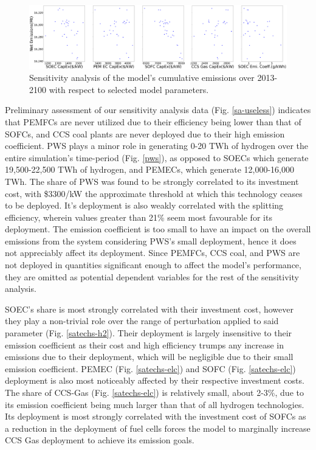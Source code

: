 \begin{figure}[H] 
\centering
\includegraphics[scale=0.15]{figures/co2emi}
\caption{Sensitivity analysis of the model's cumulative emissions over 2013-2100 with respect to selected model parameters.}
\label{co2emi}
\end{figure}

Preliminary assessment of our sensitivity analysis data (Fig. \ref{sa-useless}) indicates that \gls{PEMFC}s are never utilized due to their efficiency being lower than that of \gls{SOFC}s, and \gls{CCS} coal plants are never deployed due to their high emission coefficient. \gls{PWS} plays a minor role in generating 0-20 TWh of hydrogen over the entire simulation's time-period (Fig. \ref{pws}), as opposed to \gls{SOEC}s which generate 19,500-22,500 TWh of hydrogen, and \gls{PEMEC}s, which generate 12,000-16,000 TWh. The share of \gls{PWS} was found to be strongly correlated to its investment cost, with \$3300/kW the approximate threshold at which this technology ceases to be deployed. It's deployment is also weakly correlated with the splitting efficiency, wherein values greater than 21\% seem most favourable for its deployment. The emission coefficient is too small to have an impact on the overall emissions from the system considering \gls{PWS}'s small deployment, hence it does not appreciably affect its deployment. Since \gls{PEMFC}s, \gls{CCS} coal, and \gls{PWS} are not deployed in quantities significant enough to affect the model's performance, they are omitted as potential dependent variables for the rest of the sensitivity analysis.

\gls{SOEC}'s share is most strongly correlated with their investment cost, however they play a non-trivial role over the range of perturbation applied to said parameter (Fig. \ref{satechs-h2}). Their deployment is largely insensitive to their emission coefficient as their cost and high efficiency trumps any increase in emissions due to their deployment, which will be negligible due to their small emission coefficient. \gls{PEMEC} (Fig. \ref{satechs-elc}) and \gls{SOFC} (Fig. \ref{satechs-elc}) deployment is also most noticeably affected by their respective investment costs. The share of \gls{CCS}-Gas (Fig. \ref{satechs-elc}) is relatively small, about 2-3\%, due to its emission coefficient being much larger than that of all hydrogen technologies. Its deployment is most strongly correlated with the investment cost of \gls{SOFC}s as a reduction in the deployment of fuel cells forces the model to marginally increase CCS Gas deployment to achieve its emission goals.

